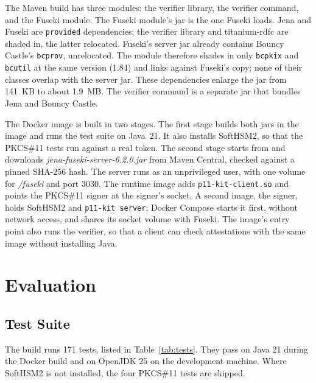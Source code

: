 \documentclass[11pt,a4paper]{article}
\newcommand{\code}[1]{\texttt{#1}}
\newcommand{\file}[1]{\textit{#1}}
\begin{document}
The Maven build has three modules: the verifier library, the verifier command, and the Fuseki
module. The Fuseki module's jar is the one Fuseki loads. Jena and Fuseki are \code{provided}
dependencies; the verifier library and titanium-rdfc are shaded in, the latter relocated.
Fuseki's server jar already contains Bouncy Castle's \code{bcprov}, unrelocated. The module
therefore shades in only \code{bcpkix} and \code{bcutil} at the same version (1.84) and links against
Fuseki's copy; none of their classes overlap with the server jar. These dependencies enlarge the
jar from 141~KB to about 1.9~MB. The verifier command is a separate jar that bundles Jena and
Bouncy Castle.

The Docker image is built in two stages. The first stage builds both jars in the
 image and runs the test suite on Java~21. It also
installs SoftHSM2, so that the PKCS\#11 tests run against a real token. The second stage starts
from  and downloads \file{jena-fuseki-server-6.2.0.jar}
from Maven Central, checked against a pinned SHA-256 hash. The server runs as an unprivileged
user, with one volume for \file{/fuseki} and port 3030. The runtime image adds
\code{p11-kit-client.so} and points the PKCS\#11 signer at the signer's socket. A second image,
the signer, holds SoftHSM2 and \code{p11-kit server}; Docker Compose starts it first, without
network access, and shares its socket volume with Fuseki. The image's entry point also runs the
verifier, so that a client can check attestations with the same image without installing Java.

\section{Evaluation}
\label{sec:eval}

\subsection{Test Suite}
\label{sec:tests}

The build runs 171 tests, listed in Table~\ref{tab:tests}. They pass on Java 21 during the
Docker build and on OpenJDK 25 on the development machine. Where SoftHSM2 is not installed,
the four PKCS\#11 tests are skipped.
\end{document}
